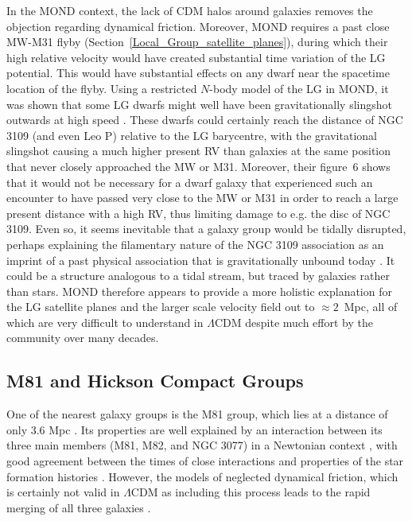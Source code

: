 \documentclass[fleqn,usenatbib,useAMS,onecolumn]{mnras} %
\begin{document}
In the MOND context, the lack of CDM halos around galaxies removes the objection regarding dynamical friction. Moreover, MOND requires a past close MW-M31 flyby (Section~\ref{Local_Group_satellite_planes}), during which their high relative velocity would have created substantial time variation of the LG potential. This would have substantial effects on any dwarf near the spacetime location of the flyby. Using a restricted $N$-body model of the LG in MOND, it was shown that some LG dwarfs might well have been gravitationally slingshot outwards at high speed \citep{Banik_2018_anisotropy}. These dwarfs could certainly reach the distance of NGC 3109 (and even Leo P) relative to the LG barycentre, with the gravitational slingshot causing a much higher present RV than galaxies at the same position that never closely approached the MW or M31. Moreover, their figure~6 shows that it would not be necessary for a dwarf galaxy that experienced such an encounter to have passed very close to the MW or M31 in order to reach a large present distance with a high RV, thus limiting damage to e.g. the disc of NGC 3109. Even so, it seems inevitable that a galaxy group would be tidally disrupted, perhaps explaining the filamentary nature of the NGC 3109 association \citep{Bellazzini_2013} as an imprint of a past physical association that is gravitationally unbound today \citep{Kourkchi_2017}. It could be a structure analogous to a tidal stream, but traced by galaxies rather than stars. MOND therefore appears to provide a more holistic explanation for the LG satellite planes and the larger scale velocity field out to $\approx 2$~Mpc, all of which are very difficult to understand in $\Lambda$CDM despite much effort by the community over many decades.



\subsection{M81 and Hickson Compact Groups}
\label{Hickson_Compact_Groups}

One of the nearest galaxy groups is the M81 group, which lies at a distance of only 3.6 Mpc \citep{Gerke_2011}. Its properties are well explained by an interaction between its three main members (M81, M82, and NGC 3077) in a Newtonian context \citep{Yun_1999}, with good agreement between the times of close interactions and properties of the star formation histories \citep{Rieke_1980}. However, the models of \citet{Yun_1999} neglected dynamical friction, which is certainly not valid in $\Lambda$CDM as including this process leads to the rapid merging of all three galaxies \citep*{Thomson_1999}.
\end{document}
